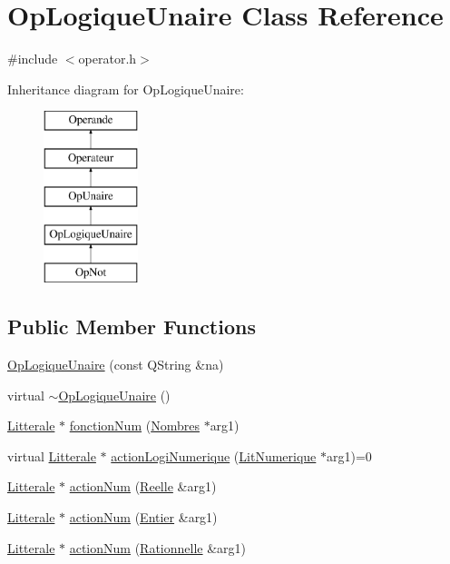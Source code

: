 \hypertarget{class_op_logique_unaire}{}\section{Op\+Logique\+Unaire Class Reference}
\label{class_op_logique_unaire}


{\ttfamily \#include $<$operator.\+h$>$}

Inheritance diagram for Op\+Logique\+Unaire\+:\begin{figure}[H]
\begin{center}
\leavevmode
\includegraphics[height=5.000000cm]{class_op_logique_unaire}
\end{center}
\end{figure}
\subsection*{Public Member Functions}
\begin{DoxyCompactItemize}
\item 
\hyperlink{class_op_logique_unaire_a05ee8fc13b4f1b1b6b0eb242e8db608a}{Op\+Logique\+Unaire} (const Q\+String \&na)
\item 
virtual \hyperlink{class_op_logique_unaire_a536c88af3cfc8df1e6d0b1b37a42e3b8}{$\sim$\+Op\+Logique\+Unaire} ()
\item 
\hyperlink{class_litterale}{Litterale} $\ast$ \hyperlink{class_op_logique_unaire_a823d44ca7bb4caf3b9b34e3ff263001b}{fonction\+Num} (\hyperlink{class_nombres}{Nombres} $\ast$arg1)
\item 
virtual \hyperlink{class_litterale}{Litterale} $\ast$ \hyperlink{class_op_logique_unaire_a89c5a27b3dc232cf69aa1631231c3fc6}{action\+Logi\+Numerique} (\hyperlink{class_lit_numerique}{Lit\+Numerique} $\ast$arg1)=0
\item 
\hyperlink{class_litterale}{Litterale} $\ast$ \hyperlink{class_op_logique_unaire_a58809367f9cd3dbb4c0f3d66c21428c0}{action\+Num} (\hyperlink{class_reelle}{Reelle} \&arg1)
\item 
\hyperlink{class_litterale}{Litterale} $\ast$ \hyperlink{class_op_logique_unaire_a396bd51e071632ec4e607473068e1a62}{action\+Num} (\hyperlink{class_entier}{Entier} \&arg1)
\item 
\hyperlink{class_litterale}{Litterale} $\ast$ \hyperlink{class_op_logique_unaire_aa6c63a7c5b288d3c9e7d194453f4cffe}{action\+Num} (\hyperlink{class_rationnelle}{Rationnelle} \&arg1)
\end{DoxyCompactItemize}
